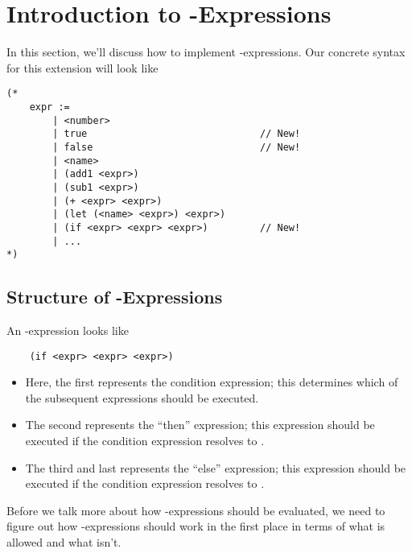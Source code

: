 \documentclass[letterpaper]{article}
\begin{document}
\section{Introduction to -Expressions}
In this section, we'll discuss how to implement -expressions. Our concrete syntax for this extension will look like 
\begin{verbatim}
(*
    expr :=
        | <number>
        | true                              // New!
        | false                             // New!
        | <name>
        | (add1 <expr>)
        | (sub1 <expr>)
        | (+ <expr> <expr>)
        | (let (<name> <expr>) <expr>)
        | (if <expr> <expr> <expr>)         // New!
        | ... 
*)\end{verbatim}

\subsection{Structure of -Expressions}
An -expression looks like 
\begin{verbatim}
    (if <expr> <expr> <expr>)\end{verbatim}

\begin{itemize}
    \item Here, the first  represents the condition expression; this determines which of the subsequent expressions should be executed. 
    \item The second  represents the ``then'' expression; this expression should be executed if the condition expression resolves to .
    \item The third and last  represents the ``else'' expression; this expression should be executed if the condition expression resolves to .
\end{itemize}
Before we talk more about how -expressions should be evaluated, we need to figure out how -expressions should work in the first place in terms of what is allowed and what isn't. 
\end{document}

